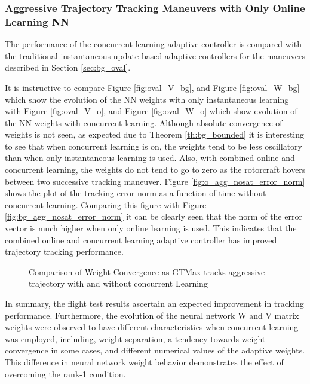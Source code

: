 \subsubsection{Aggressive Trajectory Tracking Maneuvers with Only Online Learning NN}
The performance of the concurrent learning adaptive controller is compared with the traditional instantaneous update based adaptive controllers for the maneuvers described in Section \ref{sec:bg_oval}.

It is instructive to compare Figure \ref{fig:oval_V_bg}, and Figure \ref{fig:oval_W_bg} which show the evolution of the NN weights with only instantaneous learning with Figure \ref{fig:oval_V_o}, and Figure \ref{fig:oval_W_o} which show evolution of the NN weights with concurrent learning. Although absolute convergence of weights is not seen, as expected due to Theorem \ref{th:bg_bounded} it is interesting to see that when concurrent learning is on, the weights tend to be less oscillatory than when only instantaneous learning is used. Also, with combined online and concurrent learning, the weights do not tend to go to zero as the rotorcraft hovers between two successive tracking maneuver. Figure \ref{fig:o_agg_nosat_error_norm} shows the plot of the tracking error norm as a function of time without concurrent learning. Comparing this figure with Figure \ref{fig:bg_agg_nosat_error_norm} it can be clearly seen that the norm of the error vector is much higher when only online learning is used. This indicates that the combined online and concurrent learning adaptive controller has improved trajectory tracking performance.
\begin{figure}[H]
\centering
{}
\caption{Comparison of Weight Convergence as GTMax tracks aggressive trajectory with and without concurrent Learning }
\label{fig:oval_weights}
\end{figure}
In summary, the flight test results ascertain an expected improvement in tracking performance.  Furthermore, the evolution of the neural network W and V matrix weights were observed to have different characteristics when concurrent learning was employed, including, weight separation, a tendency towards weight convergence in some cases, and different numerical values of the adaptive weights. This difference in neural network weight behavior demonstrates the effect of overcoming the rank-1 condition.

